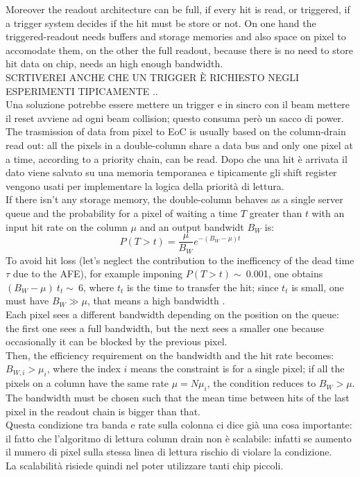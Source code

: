    Moreover the readout architecture can be full, if every hit is read, or triggered, if a trigger system decides if the hit must be store or not. On one hand the triggered-readout needs buffers and storage memories and also space on pixel to accomodate them, on the other the full readout, because there is no need to store hit data on chip, needs an high enough bandwidth.\\
   SCRTIVEREI ANCHE CHE UN TRIGGER È RICHIESTO NEGLI ESPERIMENTI TIPICAMENTE ..\\   Una soluzione potrebbe essere mettere un trigger e in sincro con il beam mettere il reset avviene ad ogni beam collision; questo consuma però un sacco di power. \\

   The trasmission of data from pixel to EoC is usually based on the column-drain read out: all the pixels in a double-column share a data bus and only one pixel at a time, according to a priority chain, can be read. Dopo che una hit è arrivata il dato viene salvato su una memoria temporanea e tipicamente gli shift register vengono usati per implementare la logica della priorità di lettura.\\
   If there isn't any storage memory, the double-column behaves as a single server queue and the probability for a pixel of waiting a time $T$ greater than $t$ with an input hit rate on the column $\mu$ and an output bandwidt $B_W$ is\cite{Garcia-Review}:
   \begin{equation}
   P(T > t) = \frac{\mu}{B_W} e^{-( B_W-\mu )t}
   \label{eq:priority_chain_no_buffer}
   \end{equation}
   To avoid hit loss (let's neglect the contribution to the inefficency of the dead time $\tau$ due to the AFE), for example imponing $P(T > t)\sim\:$0.001, one obtains $(B_W -\mu)\:t_t\sim\:$6, where $t_t$ is the time to transfer the hit; since $t_t$ is small, one must have $B_W \gg \mu$, that means a high bandwidth \cite{Garcia-Review}.\\
   Each pixel sees a different bandwidth depending on the position on the queue: the first one sees a full bandwidth, but the next sees a smaller one because occasionally it can be blocked by the previous pixel.\\
   Then, the efficiency requirement on the bandwidth and the hit rate becomes: $B_{W,i} > \mu_{i}$, where the index $i$ means the constraint is for a single pixel; if all the pixels on a column have the same rate $\mu = N\mu_{i}$, the condition reduces to $B_{W} > \mu$.
   The bandwidth must be chosen such that the mean time between hits of the last pixel in the readout chain is bigger than that.\\
   Questa condizione tra banda e rate sulla colonna ci dice già una cosa importante: il fatto che l'algoritmo di lettura column drain non è scalabile: infatti se aumento il numero di pixel sulla stessa linea di lettura rischio di violare la condizione.\\
   La scalabilità risiede quindi nel poter utilizzare tanti chip piccoli.\\


